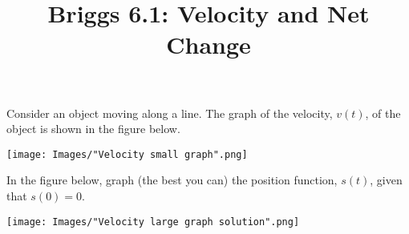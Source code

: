 \documentclass[nooutcomes]{ximera}
\title{Briggs 6.1: Velocity and Net Change}
\begin{document}
\begin{abstract}
\end{abstract}
\maketitle


\begin{problem}
 
  Consider an object moving along a line.
  The graph of the velocity, $v(t)$, of the object is shown in the figure below.
  \begin{image}
    \texttt{[image: Images/"Velocity small graph".png]}
  \end{image}

  In the figure below, graph (the best you can) the position function, $s(t)$, given that $s(0) = 0$.
  \begin{image}
    \texttt{[image: Images/"Velocity large graph solution".png]}
  \end{image}
\end{problem}
\end{document}

